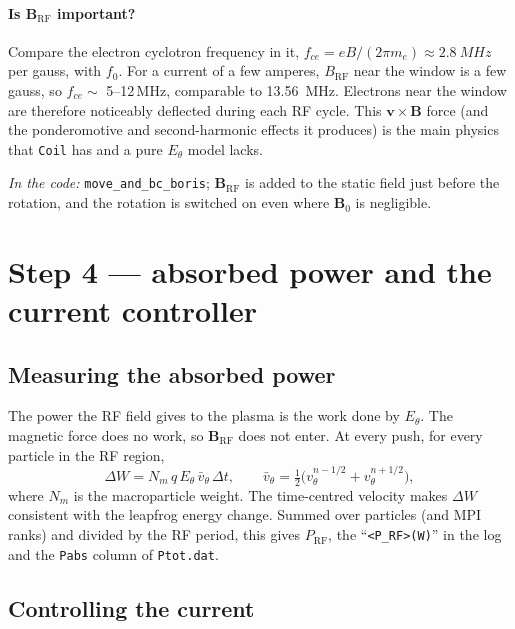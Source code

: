 \documentclass[11pt,a4paper]{article}
\newcommand{\code}[1]{\texttt{#1}}
\newcommand{\incode}[1]{\par\smallskip\noindent\textit{In the code:} #1\par\smallskip}
\begin{document}
\paragraph{Is $\mathbf B_{\mathrm{RF}}$ important?} Compare the electron
cyclotron frequency in it, $f_{ce} = eB/(2\pi m_e) \approx
\SI{2.8}{MHz}$ per gauss, with $f_0$. For a current of a few amperes,
$B_{\mathrm{RF}}$ near the window is a few gauss, so
$f_{ce}\sim$ 5--12\,MHz, comparable to \SI{13.56}{MHz}. Electrons near the
window are therefore noticeably deflected during each RF cycle. This
$\mathbf v\times\mathbf B$ force (and the ponderomotive and second-harmonic
effects it produces) is the main physics that \code{Coil} has and a pure
$E_\theta$ model lacks.

\incode{\code{move\_and\_bc\_boris}; $\mathbf B_{\mathrm{RF}}$ is added to
the static field just before the rotation, and the rotation is switched on
even where $\mathbf B_0$ is negligible.}

\section{Step 4 --- absorbed power and the current controller}

\subsection{Measuring the absorbed power}

The power the RF field gives to the plasma is the work done by
$E_\theta$. The magnetic force does no work, so $\mathbf B_{\mathrm{RF}}$
does not enter. At every push, for every particle in the RF region,
\begin{equation}
  \Delta W = N_m\, q\, E_\theta\, \bar v_\theta\,\Delta t,
  \qquad
  \bar v_\theta = \tfrac12\big(v_\theta^{n-1/2} + v_\theta^{n+1/2}\big),
\end{equation}
where $N_m$ is the macroparticle weight. The time-centred velocity makes
$\Delta W$ consistent with the leapfrog energy change. Summed over particles
(and MPI ranks) and divided by the RF period, this gives
$P_{\mathrm{RF}}$, the ``\code{<P\_RF>(W)}'' in the log and the
\code{Pabs} column of \code{Ptot.dat}.

\subsection{Controlling the current}
\end{document}
